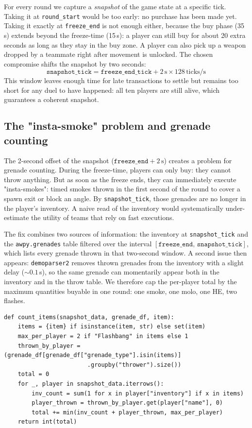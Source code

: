 For every round we capture a \emph{snapshot} of the game state at a
specific tick. Taking it at \texttt{round\_start} would be too early:
no purchase has been made yet. Taking it exactly at
\texttt{freeze\_end} is not enough either, because the buy phase
(35\,s) extends beyond the freeze-time (15\,s): a player can still
buy for about 20 extra seconds as long as they stay in the buy zone.
A player can also pick up a weapon dropped by a teammate right after
movement is unlocked. The chosen compromise shifts the snapshot by
two seconds:
\[
\texttt{snapshot\_tick} = \texttt{freeze\_end\_tick} + 2\,\text{s} \times 128\,\text{ticks/s}
\]
This window leaves enough time for late transactions to settle but
remains too short for any duel to have happened: all ten players are
still alive, which guarantees a coherent snapshot.

\subsection{The "insta-smoke" problem and grenade counting}

The 2-second offset of the snapshot
($\texttt{freeze\_end} + 2\,\text{s}$) creates a problem for grenade
counting. During the freeze-time, players can only buy: they cannot
throw anything. But as soon as the freeze ends, they can immediately
execute "insta-smokes": timed smokes thrown in the first second of
the round to cover a spawn exit or block an angle. By
\texttt{snapshot\_tick}, those grenades are no longer in the player's
inventory. A naive read of the inventory would systematically
under-estimate the utility of teams that rely on fast executions.

The fix combines two sources of information: the inventory at
\texttt{snapshot\_tick} and the \texttt{awpy.grenades} table filtered
over the interval
$[\texttt{freeze\_end},\,\texttt{snapshot\_tick}]$, which lists every
grenade thrown in that two-second window. A second issue then
appears: \texttt{demoparser2} removes thrown grenades from the
inventory with a slight delay ($\sim 0.1$\,s), so the same grenade
can momentarily appear both in the inventory and in the throw table.
We therefore cap the per-player total by the maximum quantities
buyable in one round: one smoke, one molo, one HE, two flashes.

\begin{lstlisting}
def count_items(snapshot_data, grenade_df, item):
    items = {item} if isinstance(item, str) else set(item)
    max_per_player = 2 if "Flashbang" in items else 1
    thrown_by_player = (grenade_df[grenade_df["grenade_type"].isin(items)]
                        .groupby("thrower").size())
    total = 0
    for _, player in snapshot_data.iterrows():
        inv_count = sum(1 for x in player["inventory"] if x in items)
        player_thrown = thrown_by_player.get(player["name"], 0)
        total += min(inv_count + player_thrown, max_per_player)
    return int(total)
\end{lstlisting}

